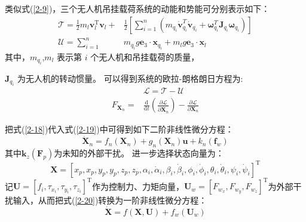 类似式(\ref{2-9})，三个无人机吊挂载荷系统的动能和势能可分别表示如下：
\begin{equation}
	\begin{aligned}
	\mathcal{T}=\frac{1}{2}m_{l}{\boldsymbol{v}}_{l}^\mathrm{T}{\boldsymbol{v}}_{l}+&\frac{1}{2}\left[\sum_{i=1}^{n}\left(m_{q_{i}}\dot{\boldsymbol{v}}_{q_{i}}^{T}\dot{\boldsymbol{v}}_{q_{i}}+\boldsymbol{\omega}_{q_{i}}^{T}\boldsymbol{J}_{q_{i}}\boldsymbol{\omega}_{q_{i}}\right)\right] \\
	\mathcal{U}=\sum_{i=1}^{n}&m_{q_{i}}g\boldsymbol{e}_3\cdot\boldsymbol{x}_{q_{i}}+m_{l}g\boldsymbol{e}_3\cdot\boldsymbol{x}_{l}
\end{aligned}
\label{2-18}
\end{equation}
其中，$m_{q_{i}}$,$m_l$ 表示第 $i$ 个无人机和吊挂载荷的质量，

$\boldsymbol{J}_{q_{i}}$ 为无人机的转动惯量。
可以得到系统的欧拉-朗格朗日方程为:
\begin{equation}
\begin{aligned}
	&\mathcal{L}=\mathcal{T}-\mathcal{U} \\
	{F}_{\boldsymbol{X}_n}=&\frac{\mathrm{d}}{\mathrm{d}t}\left(\frac{\partial\mathcal{L}}{\partial\dot{\boldsymbol{X}_n}}\right)-\frac{\partial\mathcal{L}}{\partial\boldsymbol{X}_n}
\end{aligned}
\label{2-19}
\end{equation}


把式(\ref{2-18})代入式(\ref{2-19})中可得到如下二阶非线性微分方程：
\begin{equation}	
	\dot{\bm X}_n= f_n(\bm X_n)+ g_n(\bm X_n)\bm u+ k_{n}\left(\bm f_{w}\right)
	\label{2-20}
\end{equation}
其中$\bm k_{z}\left(\bm F_{p}\right)$为未知的外部干扰。
进一步选择状态向量为：$$\bm X=\left[x_{p},x_{p},y_{p},y_{p},z_{p},z_{p},\alpha_{i},\dot{\alpha}_{i},\beta_{i},\dot{\beta}_{i},\phi_{i},\dot{\phi}_{i},\theta_{i},\dot{\theta}_{i},\psi_{i},\dot{\psi}_{i}\right]^\mathrm{T}$$
记$\bm{U}=\left[f_i,\tau_{x_i},\tau_{y_i},\tau_{z_i}\right]^\mathrm{T}$作为控制力、力矩向量，${\boldsymbol{U}}_{w}=\left[F_{w_x},F_{w_y},F_{w_z}\right]^\mathrm{T}$为外部干扰输入，从而把式(\ref{2-20})转换为一阶非线性微分方程：
\begin{equation}
	\dot{\boldsymbol{X}}= f\left(\boldsymbol{X},\boldsymbol{U}\right)+ f_w\left(\boldsymbol{U}_w\right)
	\label{2-21}
\end{equation}

